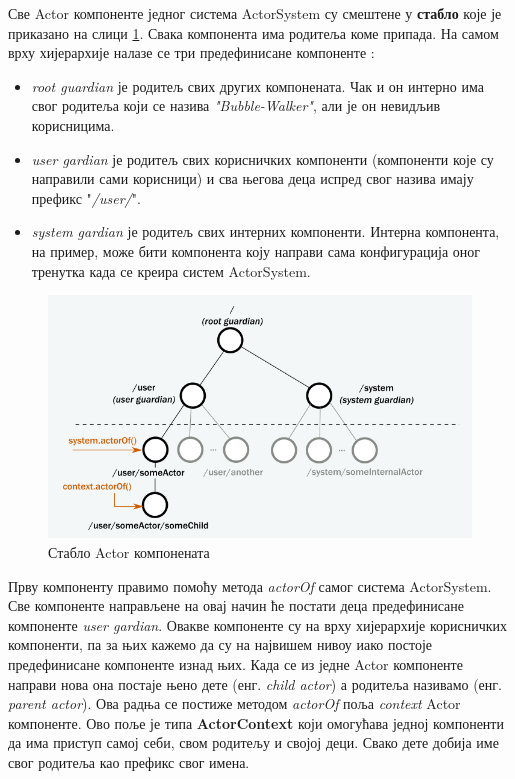 \documentclass[12pt,oneside]{memoir}
\begin{document}
Све Actor компоненте једног система ActorSystem су смештене у \textbf{стабло} које је приказано на слици \ref{fig:stablo}. Свака компонента има родитеља коме припада. На самом врху хијерархије налазе се три предефинисане компоненте \cite{akkaDoc}:
\begin{itemize}
\item \textit{root guardian} је родитељ свих других компонената. Чак и он интерно има свог родитеља који се назива \textit{"Bubble-Walker"}, али је он невидљив корисницима.
\item \textit{user gardian} је родитељ свих корисничких компоненти (компоненти које су направили сами корисници) и сва његова деца испред свог назива имају префикс "\textit{/user/}".
\item \textit{system gardian} је родитељ свих интерних компоненти. Интерна компонента, на пример, може бити компонента коју направи сама конфигурација оног тренутка када се креира систем ActorSystem. 
\end{itemize}

\begin{figure}[!ht]
  \centering
  \includegraphics[width=1\textwidth]{akkaTree.png}
  \caption{Стабло Actor компонената}
  \label{fig:stablo}
\end{figure}

Прву компоненту правимо помоћу метода \textit{actorOf} самог система ActorSystem. Све компоненте направљене на овај начин ће постати деца предефинисане компоненте \textit{user gardian}. Овакве компоненте су на врху хијерархије корисничких компоненти, па за њих кажемо да су на највишем нивоу иако постоје предефинисане компоненте изнад њих. Када се из једне Actor компоненте направи нова она постаје њено дете (енг. \textit{child actor}) а родитеља називамо (енг. \textit{parent actor}). Ова радња се постиже методом \textit{actorOf} поља \textit{context} Actor компоненте. Ово поље је типа \textbf{ActorContext} који омогућава једној компоненти да има приступ самој себи, свом родитељу и својој деци. Свако дете добија име свог родитеља као префикс свог имена.
\end{document}

